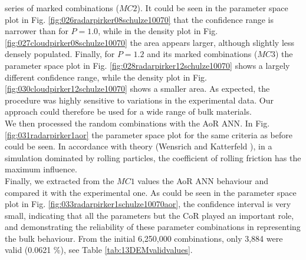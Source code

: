 series of marked combinations ($MC2$).
It could be seen in the parameter space plot in Fig.
\ref{fig:026radarpirker08schulze10070} that the confidence range is narrower
than for $P=1.0$, while in the density plot in Fig. 
\ref{fig:027cloudpirker08schulze10070} the area
appears larger, although slightly less densely populated. Finally, for $P=1.2$
and its marked combinations ($MC3$) the parameter space plot in Fig.
\ref{fig:028radarpirker12schulze10070} shows a largely different confidence
range, while the density plot in Fig. \ref{fig:030cloudpirker12schulze10070} 
shows a smaller area. As expected, the procedure was highly sensitive to
variations in the experimental data.
Our approach could therefore be used
for a wide range of bulk materials.\\
We then processed the random combinations with the \acs{AoR} \acs{ANN}. In Fig.
\ref{fig:031radarpirker1aor} the parameter space plot for the same criteria as
before could be seen.
In accordance with theory (Wensrich and Katterfeld \cite{RefWorks:87}), in a simulation dominated
by rolling particles, the coefficient of rolling friction has the maximum
influence. \\
Finally, we extracted from the $MC1$ values the \acs{AoR} \acs{ANN} behaviour
and compared it with the experimental one.
As could be seen in the parameter space plot in Fig.
\ref{fig:033radarpirker1schulze10070aor}, the confidence interval is very small,
indicating that all the parameters but the \acs{CoR} played an important role, 
and demonstrating the reliability of these parameter
combinations in representing the bulk behaviour.
From the initial 6,250,000 combinations, only 3,884 were valid (0.0621
\%), see Table \ref{tab:13DEMvalidvalues}.









